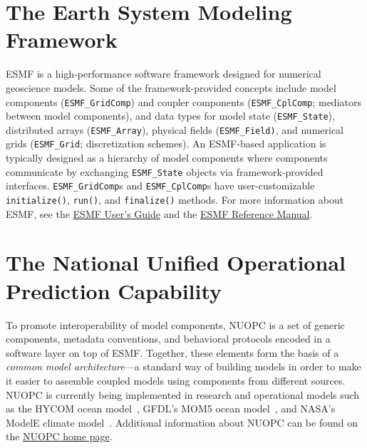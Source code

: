 \documentclass[oneside,11pt]{memoir}
\begin{document}
\section{The Earth System Modeling Framework}
ESMF is a high-performance software framework designed for numerical geoscience models. Some of the framework-provided concepts include model components (\texttt{ESMF\_GridComp}) and coupler components (\texttt{ESMF\_CplComp}; mediators between model components), and data types for model state (\texttt{ESMF\_State}), distributed arrays (\texttt{ESMF\_Array}), physical fields (\texttt{ESMF\_Field)}, and numerical grids (\texttt{ESMF\_Grid}; discretization schemes). An ESMF-based application is typically designed as a hierarchy of model components where components communicate by exchanging \texttt{ESMF\_State} objects via framework-provided interfaces. \texttt{ESMF\_GridComp}s and \texttt{ESMF\_CplComp}s have user-customizable \texttt{initialize()}, \texttt{run()}, and \texttt{finalize()} methods.  For more information about ESMF, see the \href{http://www.earthsystemmodeling.org/esmf_releases/public/last/ESMF_usrdoc/}{ESMF User's Guide} and the \href{http://www.earthsystemmodeling.org/esmf_releases/public/last/ESMF_refdoc/}{ESMF Reference Manual}.

\section{The National Unified Operational Prediction Capability}
To promote interoperability of model components, NUOPC is a set of generic components, metadata conventions, and behavioral protocols encoded in a software layer on top of ESMF. Together, these elements form the basis of a \emph{common model architecture}---a standard way of building models in order to make it easier to assemble coupled models using components from different sources. NUOPC is currently being implemented in research and operational models such as the HYCOM ocean model~\cite{hycom}, GFDL's MOM5 ocean model~\cite{mom5}, and NASA's ModelE climate model~\cite{modele}.  Additional information about NUOPC can be found on the \href{https://earthsystemcog.org/projects/nuopc/}{NUOPC home page}.

\end{document}
